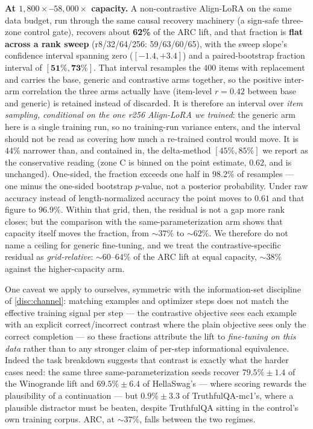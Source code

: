 \textbf{At $1{,}800\times$--$58{,}000\times$ capacity.} A non-contrastive Align-LoRA
on the same data budget, run through the same causal recovery machinery (a sign-safe
three-zone control gate), recovers about \textbf{62\%} of the ARC lift, and that
fraction is \textbf{flat across a rank sweep} (r8/32/64/256: 59/63/60/65), with the
sweep slope's confidence interval spanning zero ($[-1.4, +3.4]$) and a
paired-bootstrap fraction interval of $\mathbf{[51\%, 73\%]}$. That interval resamples
the $400$ items with replacement and carries the base, generic and contrastive arms
together, so the positive inter-arm correlation the three arms actually have
(item-level $r{=}0.42$ between base and generic) is retained instead of discarded.
It is therefore an interval over \emph{item sampling, conditional on the one r256
Align-LoRA we trained}: the generic arm here is a single training run, so no
training-run variance enters, and the interval should not be read as covering how
much a re-trained control would move. It
is $44\%$ narrower than, and contained in, the delta-method $[45\%, 85\%]$ we report
as the conservative reading (zone C is binned on the point estimate, $0.62$, and is
unchanged). One-sided, the fraction exceeds one half in $98.2\%$ of resamples --- one
minus the one-sided bootstrap $p$-value, not a posterior probability. Under raw
accuracy instead of length-normalized accuracy the point moves to $0.61$ and that
figure to $96.9\%$. Within that grid, then, the
residual is not a gap more rank closes; but the comparison with the
same-parameterization arm shows that capacity itself moves the fraction, from
${\sim}37\%$ to ${\sim}62\%$. We therefore do not name a ceiling for generic
fine-tuning, and we treat the contrastive-specific residual as \emph{grid-relative}:
${\sim}60$--$64\%$ of the ARC lift at equal capacity, ${\sim}38\%$ against the
higher-capacity arm.

One caveat we apply to ourselves, symmetric with the information-set discipline of
\cref{disc:channel}: matching examples and optimizer steps does not match the
effective training signal per step --- the contrastive objective sees each example
with an explicit correct/incorrect contrast where the plain objective sees only the
correct completion --- so these fractions attribute the lift to \emph{fine-tuning on
this data} rather than to any stronger claim of per-step informational equivalence.
Indeed the task breakdown suggests that contrast is exactly what the harder cases
need: the same three same-parameterization seeds recover $79.5\% \pm 1.4$ of the
Winogrande lift and $69.5\% \pm 6.4$ of HellaSwag's --- where scoring rewards the
plausibility of a continuation --- but $0.9\% \pm 3.3$ of TruthfulQA-mc1's, where a
plausible distractor must be beaten, despite TruthfulQA sitting in the control's own
training corpus. ARC, at ${\sim}37\%$, falls between the two regimes.

